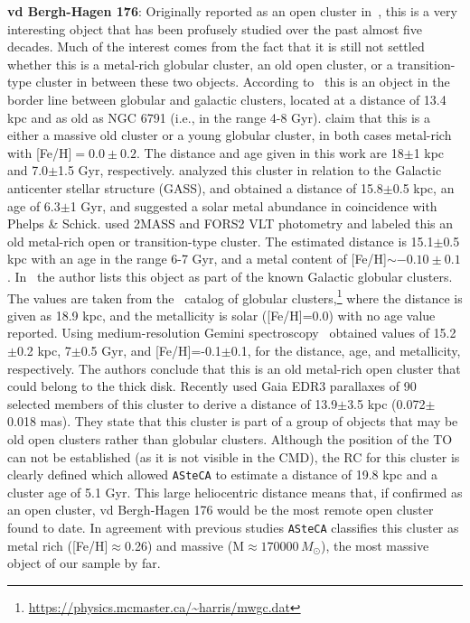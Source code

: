 \documentclass[draft]{aa}
\begin{document}
  \textbf{vd Bergh-Hagen 176}: Originally reported as an open cluster
  in~\cite{vandenBergh_1975}, this is a very interesting object that has been
  profusely studied over the past almost five decades. Much of the interest
  comes from the fact that it is still not settled whether this is a metal-rich
  globular cluster, an old open cluster, or a transition-type cluster in between
  these two objects.
  According to~\cite{Ortolani_1995} this is an object in the border line
  between globular and galactic clusters, located at a distance of 13.4 kpc
  and as old as NGC 6791 (i.e., in the range 4-8 Gyr).
  \cite{Phelps_2003} claim that this is a either a massive old cluster or a
  young globular cluster, in both cases metal-rich with [Fe/H]$=0.0\pm0.2$.
  The distance and age given in this work are 18$\pm$1 kpc and 7.0$\pm$1.5 Gyr,
  respectively.
  \cite{Frinchaboy_2006} analyzed this cluster in relation to the Galactic
  anticenter stellar structure (GASS), and obtained a distance of 15.8$\pm$0.5
  kpc, an age of 6.3$\pm$1 Gyr, and suggested a solar metal abundance in
  coincidence with Phelps \& Schick.
  \cite{Davoust_2011} used 2MASS and FORS2 VLT photometry and labeled this an
  old metal-rich open or transition-type cluster. The estimated  distance is
  15.1$\pm$0.5 kpc with an age in the range 6-7 Gyr, and a metal content of
  [Fe/H]$\sim-0.10\pm0.1$.
  In~\cite{vandenBergh_2011} the author lists this object as part of the known
  Galactic globular clusters. The values are taken from
  the~\cite{Harris_1996,Harris_2010} catalog of globular
  clusters,\footnote{\url{https://physics.mcmaster.ca/~harris/mwgc.dat}}
  where the distance is given as 18.9 kpc,
  and the metallicity is solar ([Fe/H]=0.0) with no age value reported.
  Using medium-resolution Gemini spectroscopy~\cite{Sharina_2014} obtained
  values of 15.2$\pm$0.2 kpc, 7$\pm$0.5 Gyr, and [Fe/H]=-0.1$\pm$0.1, for the
  distance, age, and metallicity, respectively. The authors conclude that this
  is an old metal-rich open cluster that could belong to the thick disk.
  Recently \cite{Vasiliev_2021} used Gaia EDR3 parallaxes of 90 selected
  members of this cluster to derive a distance of 13.9$\pm$3.5 kpc
  (0.072$\pm$0.018 mas). They state that this cluster is part of a group of
  objects that may be old open clusters rather than globular clusters.
  Although the position of the TO can not be established (as it is not visible
  in the CMD), the RC for this cluster is clearly defined which allowed
  \texttt{ASteCA} to estimate a distance of 19.8 kpc and a cluster age of 5.1
  Gyr. This large heliocentric distance means that, if confirmed as an open
  cluster, vd Bergh-Hagen 176 would be the most remote open cluster found to
  date. In agreement with previous studies \texttt{ASteCA} classifies this
  cluster as metal rich ([Fe/H]$\approx$0.26) and massive (M$\approx170000\,
  M_{\odot}$), the most massive object of our sample by far.\\
\end{document}
